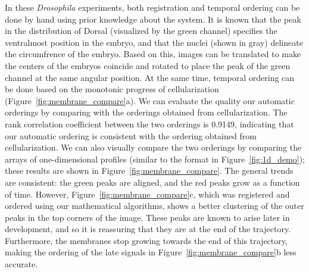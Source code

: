 \documentclass{pnastwo}
\begin{document}
\begin{article}
In these {\em Drosophila} experiments, both registration and temporal ordering can be done by hand using prior knowledge about the system. 
%
It is known that the peak in the distribution of Dorsal (visualized by the green channel) specifies the ventralmost position in the embryo, and that the nuclei (shown in gray) delineate the circumfrence of the embryo. 
%
Based on this, images can be translated to make the centers of the embryos coincide and rotated to place the peak of the green channel at the same angular position. 
%
At the same time, temporal ordering can be done based on the monotonic progress of cellularization (Figure~\ref{fig:membrane_compare}a). 
%
We can evaluate the quality our automatic orderings by comparing with the orderings obtained from cellularization.
%
The rank correlation coefficient between the two orderings is 0.9149, indicating that our automatic ordering is consistent with the ordering obtained from cellularization.
%
We can also visually compare the two orderings by comparing the arrays of one-dimensional profiles (similar to the format in Figure~\ref{fig:1d_demo});
these results are shown in Figure~\ref{fig:membrane_compare}.
%
The general trends are consistent:
the green peaks are aligned, and the red peaks grow as a function of time. 
%
However, Figure~\ref{fig:membrane_compare}c, which was registered and ordered using our mathematical algorithms, shows a better clustering of the outer peaks in the top corners of the image.
%
%
These peaks are known to arise later in development, and so it is reassuring that they are at the end of the trajectory.
%
Furthermore, the membranes stop growing towards the end of this trajectory, making the ordering of the late signals in Figure~\ref{fig:membrane_compare}b less accurate.



\end{article}
\end{document}
